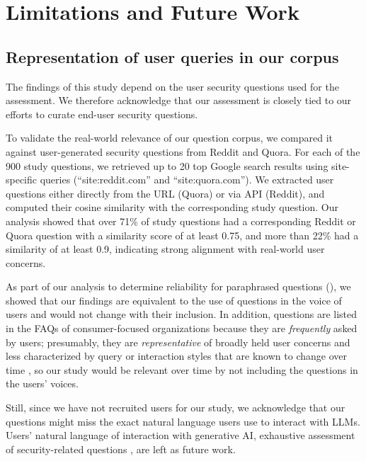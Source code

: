 \section{Limitations and Future Work} 
\subsection{Representation of user queries in our corpus}
\label{sec:represent}

The findings of this study depend on the user security questions used for the assessment. We therefore acknowledge that our assessment is closely tied to our efforts to curate end-user security questions.

To validate the real-world relevance of our question corpus, we compared it against user-generated security questions from Reddit and Quora. For each of the 900 study questions, we retrieved up to 20 top Google search results using site-specific queries (“site:reddit.com” and “site:quora.com”). We extracted user questions either directly from the URL (Quora) or via API (Reddit), and computed their cosine similarity with the corresponding study question. Our analysis showed that over 71\% of study questions had a corresponding Reddit or Quora question with a similarity score of at least 0.75, and more than 22\% had a similarity of at least 0.9, indicating strong alignment with real-world user concerns.

As part of our analysis to determine reliability for paraphrased questions (), we showed that our findings are equivalent to the use of questions in the voice of users and would not change with their inclusion. In addition, questions are listed in the FAQs of consumer-focused organizations because they are \textit{frequently} asked by users; presumably, they are \textit{representative} of broadly held user concerns and less characterized by query or interaction styles that are known to change over time \cite{evolution-of-search}, so our study would be relevant over time by not including the questions in the users' voices. %

Still, since we have not recruited users for our study, we acknowledge that our questions might miss the exact natural language users use to interact with LLMs. %
Users' natural language of interaction with generative AI, exhaustive assessment of security-related questions ,  are left as future work.

